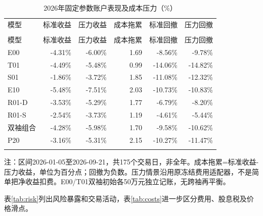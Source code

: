 \documentclass[12pt]{article}
\newcommand{\toprule}{\noalign{\hrule height .8pt}}
\newcommand{\midrule}{\noalign{\hrule height .4pt}}
\newcommand{\bottomrule}{\noalign{\hrule height .8pt}}
\begin{document}
{\small
\begin{longtable}{@{}lrrrrr@{}}
\caption{2026年固定参数账户表现及成本压力（\%）}\label{tab:recent}\\
\toprule
模型 & 标准收益 & 压力收益 & 成本拖累 & 标准回撤 & 压力回撤 \\
\midrule\endfirsthead
\multicolumn{6}{c}{表\thetable（续）}\\\toprule
模型 & 标准收益 & 压力收益 & 成本拖累 & 标准回撤 & 压力回撤 \\
\midrule\endhead
E00 & -4.31\% & -6.00\% & 1.69 & -8.56\% & -9.78\% \\
T01 & -4.49\% & -5.48\% & 0.99 & -14.06\% & -14.82\% \\
S01 & -1.86\% & -3.72\% & 1.85 & -11.08\% & -12.32\% \\
E10 & -5.48\% & -7.51\% & 2.03 & -10.73\% & -10.83\% \\
R01-D & -3.53\% & -5.29\% & 1.77 & -6.79\% & -8.20\% \\
R01-S & -2.54\% & -3.73\% & 1.19 & -4.61\% & -5.44\% \\
双袖组合 & -4.28\% & -5.98\% & 1.70 & -9.58\% & -10.62\% \\
P20 & -3.16\% & -5.31\% & 2.15 & -10.27\% & -11.47\% \\
\bottomrule\end{longtable}}
{\footnotesize\noindent 注：区间2026-01-05至2026-09-21，共175个交易日，非全年。成本拖累=标准收益-压力收益，单位为百分点；回撤为负数。压力情景沿用原冻结费用适配器，不是简单把净收益扣费。E00/T01双袖初始各50万元独立记账，无跨袖再平衡。\par}
表\ref{tab:risk}列出风险暴露和交易活动，表\ref{tab:costs}进一步区分费用、股息税及价格滑点。
\end{document}
